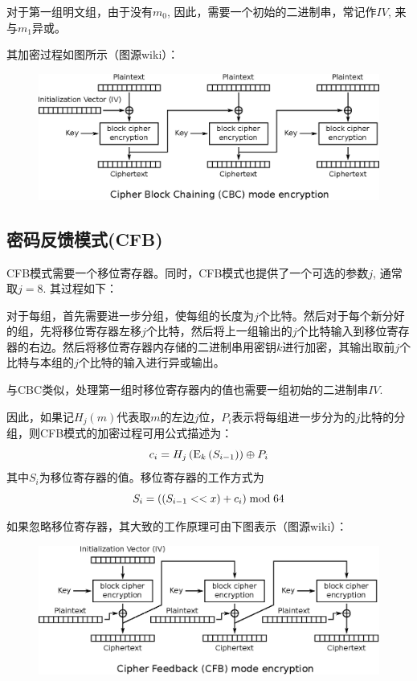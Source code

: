 对于第一组明文组，由于没有$m_0$, 因此，需要一个初始的二进制串，常记作$IV$, 来与$m_1$异或。\par
其加密过程如图所示（图源wiki）：
\begin{figure}[H]
\centering
\includegraphics[scale=1]{chapters/chapter_3/CBC.eps}
\end{figure}
\subsection{密码反馈模式(CFB)}
CFB模式需要一个移位寄存器。同时，CFB模式也提供了一个可选的参数$j$, 通常取$j=8$. 其过程如下：\par
对于每组，首先需要进一步分组，使每组的长度为$j$个比特。然后对于每个新分好的组，先将移位寄存器左移$j$个比特，然后将上一组输出的$j$个比特输入到移位寄存器的右边。然后将移位寄存器内存储的二进制串用密钥$k$进行加密，其输出取前$j$个比特与本组的$j$个比特的输入进行异或输出。\par
与CBC类似，处理第一组时移位寄存器内的值也需要一组初始的二进制串$IV$.\par
因此，如果记$H_j(m)$代表取$m$的左边$j$位，$P_i$表示将每组进一步分为的$j$比特的分组，则CFB模式的加密过程可用公式描述为：
\begin{equation}
c_i=H_j\left( {{\mathrm{E}_{k}\left({S_{i-1}}\right)}}\right)\oplus P_i
\end{equation}
其中$S_i$为移位寄存器的值。移位寄存器的工作方式为
\begin{equation}
S_i=\left( {\left( {S_{i-1} << x}\right)+c_i}\right)\bmod{64}
\end{equation}

如果忽略移位寄存器，其大致的工作原理可由下图表示（图源wiki）：
\begin{figure}[H]
\centering
\includegraphics[scale=1]{chapters/chapter_3/CFB.eps}
\end{figure}
